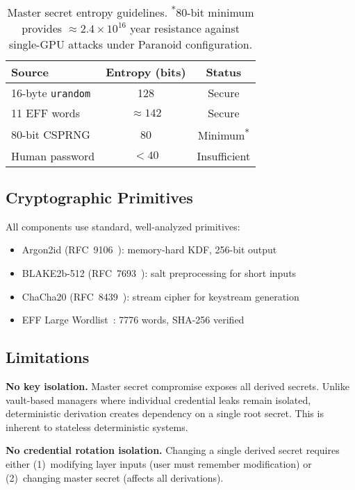 \documentclass[11pt]{article}
\begin{document}
\begin{table}[H]
\centering
\begin{tabular}{@{}lcc@{}}
\toprule
\textbf{Source} & \textbf{Entropy (bits)} & \textbf{Status} \\
\midrule
16-byte \texttt{urandom} & 128 & Secure \\
11 EFF words & $\approx 142$ & Secure \\
80-bit CSPRNG & 80 & Minimum\textsuperscript{*} \\
Human password & $< 40$ & Insufficient \\
\bottomrule
\end{tabular}
\caption{Master secret entropy guidelines. \textsuperscript{*}80-bit minimum provides $\approx 2.4 \times 10^{16}$ year resistance against single-GPU attacks under Paranoid configuration.}
\end{table}

\subsection{Cryptographic Primitives}

All components use standard, well-analyzed primitives:
\begin{itemize}
\item Argon2id (RFC~9106~\cite{rfc9106}): memory-hard KDF, 256-bit output
\item BLAKE2b-512 (RFC~7693~\cite{rfc7693}): salt preprocessing for short inputs
\item ChaCha20 (RFC~8439~\cite{rfc8439}): stream cipher for keystream generation
\item EFF Large Wordlist~\cite{eff-wordlist}: 7776 words, SHA-256 verified
\end{itemize}

\subsection{Limitations}

\textbf{No key isolation.} Master secret compromise exposes all derived secrets. Unlike vault-based managers where individual credential leaks remain isolated, deterministic derivation creates dependency on a single root secret. This is inherent to stateless deterministic systems.

\textbf{No credential rotation isolation.} Changing a single derived secret requires either (1)~modifying layer inputs (user must remember modification) or (2)~changing master secret (affects all derivations).
\end{document}
